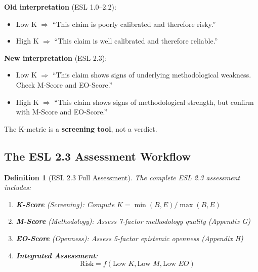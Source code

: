 \documentclass[11pt,a4paper]{article}
\newtheorem{definition}{Definition}[section]
\theoremstyle{remark}
\begin{document}
\begin{warningbox}[title={ESL 2.3: Revised Interpretation Guidelines}]
\textbf{Old interpretation} (ESL 1.0--2.2):
\begin{itemize}
    \item Low K $\Rightarrow$ ``This claim is poorly calibrated and therefore risky.''
    \item High K $\Rightarrow$ ``This claim is well calibrated and therefore reliable.''
\end{itemize}

\textbf{New interpretation} (ESL 2.3):
\begin{itemize}
    \item Low K $\Rightarrow$ ``This claim shows signs of underlying methodological weakness. Check M-Score and EO-Score.''
    \item High K $\Rightarrow$ ``This claim shows signs of methodological strength, but confirm with M-Score and EO-Score.''
\end{itemize}

The K-metric is a \textbf{screening tool}, not a verdict.
\end{warningbox}

\subsection{The ESL 2.3 Assessment Workflow}

\begin{definition}[ESL 2.3 Full Assessment]
\label{def:full-assessment}
The complete ESL 2.3 assessment includes:

\begin{enumerate}
    \item \textbf{K-Score} (Screening): Compute $K = \min(B, E) / \max(B, E)$
    \item \textbf{M-Score} (Methodology): Assess 7-factor methodology quality (Appendix G)
    \item \textbf{EO-Score} (Openness): Assess 5-factor epistemic openness (Appendix H)
    \item \textbf{Integrated Assessment}:
    \begin{equation}
    \text{Risk} = f(\text{Low } K, \text{Low } M, \text{Low } EO)
    \end{equation}
\end{enumerate}
\end{definition}
\end{document}
